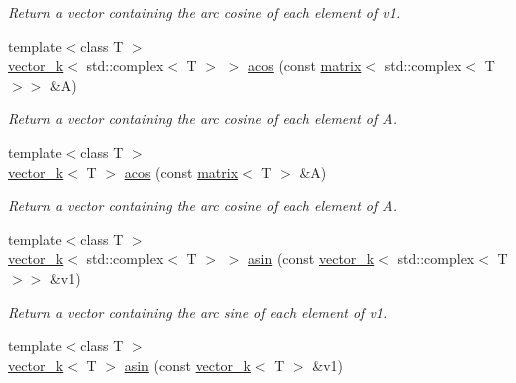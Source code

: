 \begin{DoxyCompactItemize}
\begin{DoxyCompactList}\small\item\em Return a vector containing the arc cosine of each element of v1. \end{DoxyCompactList}\item 
\hypertarget{namespacekeycpp_ae1811725cd4c1026bf8c9fa426694a6d}{{\footnotesize template$<$class T $>$ }\\\hyperlink{classkeycpp_1_1vector__k}{vector\-\_\-k}$<$ std\-::complex$<$ T $>$ $>$ \hyperlink{namespacekeycpp_ae1811725cd4c1026bf8c9fa426694a6d}{acos} (const \hyperlink{classkeycpp_1_1matrix}{matrix}$<$ std\-::complex$<$ T $>$$>$ \&A)}\label{namespacekeycpp_ae1811725cd4c1026bf8c9fa426694a6d}

\begin{DoxyCompactList}\small\item\em Return a vector containing the arc cosine of each element of A. \end{DoxyCompactList}\item 
\hypertarget{namespacekeycpp_a6c07a37d969167a8eafc372d39e84a22}{{\footnotesize template$<$class T $>$ }\\\hyperlink{classkeycpp_1_1vector__k}{vector\-\_\-k}$<$ T $>$ \hyperlink{namespacekeycpp_a6c07a37d969167a8eafc372d39e84a22}{acos} (const \hyperlink{classkeycpp_1_1matrix}{matrix}$<$ T $>$ \&A)}\label{namespacekeycpp_a6c07a37d969167a8eafc372d39e84a22}

\begin{DoxyCompactList}\small\item\em Return a vector containing the arc cosine of each element of A. \end{DoxyCompactList}\item 
\hypertarget{namespacekeycpp_a71aba9c7d78e9bd5c0e7638e6fc526ad}{{\footnotesize template$<$class T $>$ }\\\hyperlink{classkeycpp_1_1vector__k}{vector\-\_\-k}$<$ std\-::complex$<$ T $>$ $>$ \hyperlink{namespacekeycpp_a71aba9c7d78e9bd5c0e7638e6fc526ad}{asin} (const \hyperlink{classkeycpp_1_1vector__k}{vector\-\_\-k}$<$ std\-::complex$<$ T $>$$>$ \&v1)}\label{namespacekeycpp_a71aba9c7d78e9bd5c0e7638e6fc526ad}

\begin{DoxyCompactList}\small\item\em Return a vector containing the arc sine of each element of v1. \end{DoxyCompactList}\item 
\hypertarget{namespacekeycpp_a159ccc6344c3e6dc8c3206890afd47d4}{{\footnotesize template$<$class T $>$ }\\\hyperlink{classkeycpp_1_1vector__k}{vector\-\_\-k}$<$ T $>$ \hyperlink{namespacekeycpp_a159ccc6344c3e6dc8c3206890afd47d4}{asin} (const \hyperlink{classkeycpp_1_1vector__k}{vector\-\_\-k}$<$ T $>$ \&v1)}\label{namespacekeycpp_a159ccc6344c3e6dc8c3206890afd47d4}


\end{DoxyCompactItemize}
